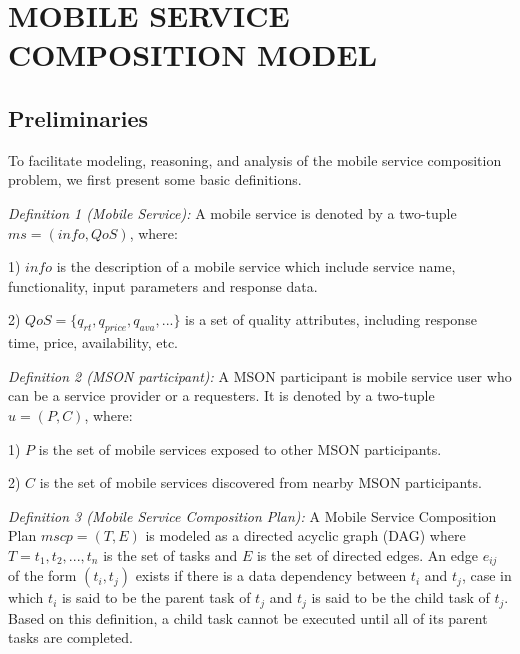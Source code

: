 \documentclass[10pt,journal,compsoc]{IEEEtran}
\begin{document}
\section{MOBILE SERVICE COMPOSITION MODEL}
\subsection{Preliminaries}
To facilitate modeling, reasoning, and analysis of the mobile service composition problem, we first present some basic definitions.

\textit{Definition 1 (Mobile Service):} A mobile service is denoted by a two-tuple $ms = (info, QoS)$, where:

1) $info$ is the description of a mobile service which include service name, functionality, input parameters and response data.

​2) $QoS = \{ q_{rt}, q_{price}, q_{ava}, ... \}$ is a set of quality attributes, including response time, price, availability, etc.

\textit{Definition 2 (MSON participant):} A MSON participant is mobile service user who can be a service provider or a requesters. It is denoted by a two-tuple $u = (P, C)$, where:

​1) $P$ is the set of mobile services exposed to other MSON participants.

​2) $C$ is the set of mobile services discovered from nearby MSON participants.

\textit{Definition 3 (Mobile Service Composition Plan):} A Mobile Service Composition Plan $mscp = (T, E)$ is modeled as a directed acyclic graph (DAG) where $T = {t_1, t_2, ..., t_n}$ is the set of tasks and $E$ is the set of directed edges. An edge $e_{ij}$ of the form $(t_i,t_j)$ exists if there is a data dependency between $t_i$
and $t_j$, case in which $t_i$ is said to be the parent task of $t_j$ and $t_j$ is said to be the child task of $t_j$. Based on this definition, a child task cannot be executed until all of its parent tasks are completed.
\end{document}
